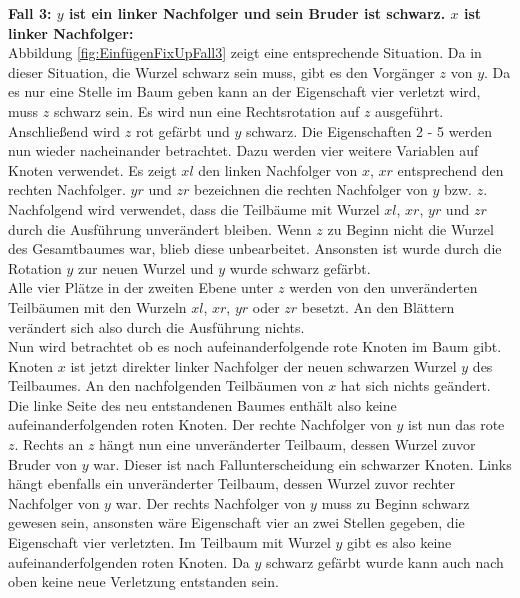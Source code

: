 \documentclass[a4paper,12pt]{article}
\begin{document}
\noindent\textbf{Fall 3: $y$ ist ein linker Nachfolger und sein Bruder ist schwarz. $x$ ist linker Nachfolger: }\\
\noindent Abbildung \ref{fig:EinfügenFixUpFall3} zeigt eine entsprechende Situation. Da in dieser Situation, die Wurzel schwarz sein muss, gibt es den Vorgänger $z$ von $y$. Da es nur eine Stelle im Baum geben kann an der Eigenschaft vier verletzt wird, muss $z$ schwarz sein. Es wird nun eine Rechtsrotation auf $z$ ausgeführt. Anschließend wird $z$ rot gefärbt und $y$ schwarz. Die Eigenschaften 2 - 5 werden nun wieder nacheinander betrachtet. Dazu werden vier weitere Variablen auf Knoten verwendet. Es zeigt $xl$ den linken Nachfolger von $x$, $xr$ entsprechend den rechten Nachfolger.  $yr$ und $zr$ bezeichnen die rechten Nachfolger von $y$ bzw. $z$. Nachfolgend wird verwendet, dass die Teilbäume mit Wurzel $xl$, $xr$, $yr$ und $zr$ durch die Ausführung unverändert bleiben.
Wenn $z$ zu Beginn nicht die Wurzel des Gesamtbaumes war, blieb diese unbearbeitet. Ansonsten ist wurde durch die Rotation $y$ zur neuen Wurzel und $y$ wurde schwarz gefärbt. \\
Alle vier Plätze in der zweiten Ebene unter $z$ werden von den unveränderten Teilbäumen mit den Wurzeln $xl$, $xr$, $yr$ oder $zr$ besetzt. An den Blättern verändert sich also durch die Ausführung nichts.   \\
Nun wird betrachtet ob es noch aufeinanderfolgende rote Knoten im Baum gibt. Knoten $x$ ist jetzt direkter linker Nachfolger der neuen schwarzen Wurzel $y$ des Teilbaumes. An den nachfolgenden Teilbäumen von $x$ hat sich nichts geändert. Die linke Seite des neu entstandenen Baumes enthält also keine aufeinanderfolgenden roten Knoten. Der rechte Nachfolger von $y$ ist nun das rote $z$. Rechts an $z$ hängt nun eine unveränderter Teilbaum, dessen Wurzel zuvor Bruder von $y$ war. Dieser ist nach Fallunterscheidung ein schwarzer Knoten. Links hängt ebenfalls ein unveränderter Teilbaum, dessen Wurzel zuvor rechter Nachfolger von $y$ war. Der rechts Nachfolger von $y$ muss zu Beginn schwarz gewesen sein, ansonsten wäre Eigenschaft vier an zwei Stellen gegeben, die Eigenschaft vier verletzten. Im Teilbaum mit Wurzel $y$ gibt es also keine aufeinanderfolgenden roten Knoten. Da $y$ schwarz gefärbt wurde kann auch nach oben keine neue Verletzung entstanden sein. 
\end{document}
